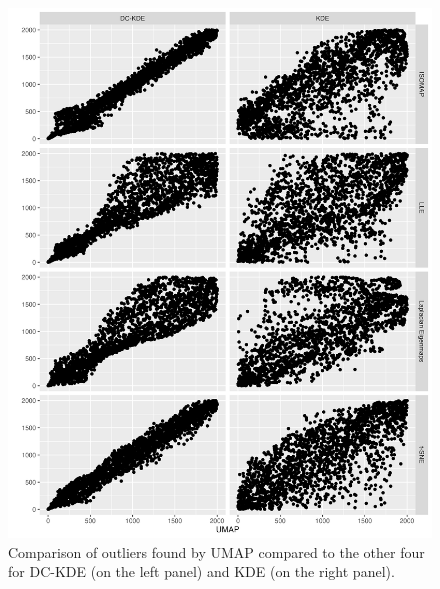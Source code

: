 \documentclass[12pt]{article}
\begin{document}
\begin{figure}

{\centering \includegraphics[width=0.95\linewidth]{figures/Twin Peak2000_density_compare_umapvs4ml_radius8_r0_5_rank} 

}

\caption{Comparison of outliers found by UMAP compared to the other four for DC-KDE (on the left panel) and KDE (on the right panel).}\label{fig:tpumapvs4ml}
\end{figure}

\clearpage

  \printbibliography
\end{document}
